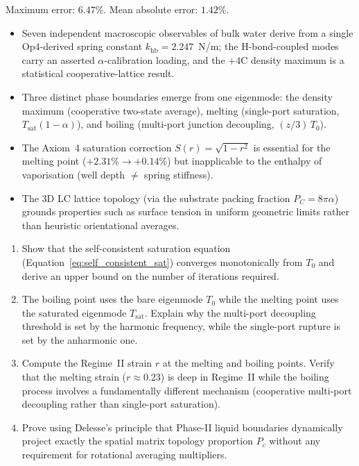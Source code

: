 Maximum error: $6.47\%$. Mean absolute error: $1.42\%$.


\begin{summarybox}
\begin{itemize}
    \item Seven independent macroscopic observables of bulk water derive from a single Op4-derived spring constant $k_\mathrm{hb} = 2.247$~N/m; the H-bond-coupled modes carry an asserted $\alpha$-calibration loading, and the $+4$\textdegree{}C density maximum is a statistical cooperative-lattice result.
    \item Three distinct phase boundaries emerge from one eigenmode: the density maximum (cooperative two-state average), melting (single-port saturation, $T_\mathrm{sat}(1-\alpha)$), and boiling (multi-port junction decoupling, $(z/3)\,T_0$).
    \item The Axiom~4 saturation correction $S(r) = \sqrt{1-r^2}$ is essential for the melting point ($+2.31\% \to +0.14\%$) but inapplicable to the enthalpy of vaporisation (well depth $\neq$ spring stiffness).
    \item The 3D LC lattice topology (via the substrate packing fraction $P_C = 8\pi\alpha$) grounds properties such as surface tension in uniform geometric limits rather than heuristic orientational averages.
\end{itemize}
\end{summarybox}

\begin{exercisebox}
\begin{enumerate}
    \item Show that the self-consistent saturation equation (Equation~\ref{eq:self_consistent_sat}) converges monotonically from $T_0$ and derive an upper bound on the number of iterations required.
    \item The boiling point uses the bare eigenmode $T_0$ while the melting point uses the saturated eigenmode $T_\mathrm{sat}$. Explain why the multi-port decoupling threshold is set by the harmonic frequency, while the single-port rupture is set by the anharmonic one.
    \item Compute the Regime~II strain $r$ at the melting and boiling points. Verify that the melting strain ($r \approx 0.23$) is deep in Regime~II while the boiling process involves a fundamentally different mechanism (cooperative multi-port decoupling rather than single-port saturation).
    \item Prove using Delesse's principle that Phase-II liquid boundaries dynamically project exactly the spatial matrix topology proportion $P_c$ without any requirement for rotational averaging multipliers.
\end{enumerate}
\end{exercisebox}
